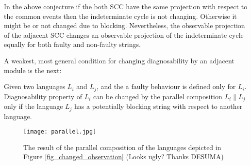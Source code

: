 \documentclass[a4paper, 10pt, conference]{ieeeconf} \IEEEoverridecommandlockouts
\begin{document}
In the above conjecture if the both SCC have the same projection with respect to
the common events then the indeterminate cycle is not changing. Otherwise it
might be or not changed due to blocking. Nevertheless, the observable
projection of the adjacent SCC changes an observable projection of
the indeterminate cycle equally for both faulty and non-faulty strings.

A weakest, most general condition for changing diagnosability by an
adjacent module is the next:

\begin{conjecture} Given two
languages $L_i$ and $L_j$, and the a faulty behaviour is defined only for $L_i$.
Diagnosability property of $L_i$ can be changed by the parallel composition $L_i
\parallel L_j$ only if the language $L_j$ has a potentially blocking string with
respect to another language.
\end{conjecture}






\begin{figure}[ht]
\centering
	\texttt{[image: parallel.jpg]}
	\caption{The result of the parallel composition of the languages depicted in
	Figure \ref{fig_changed_observation} (Looks ugly? Thanks DESUMA)}
	\label{fig_example_parallel}
\end{figure}
\end{document}
